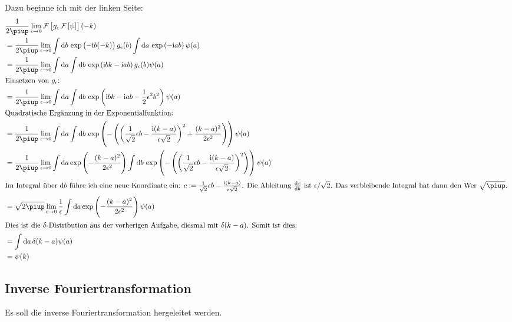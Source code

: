 Dazu beginne ich mit der linken Seite:
\begin{align*}
	& \frac1{2\piup} \lim_{\epsilon\to0} \fourier\sbr{g_\epsilon \fourier\sbr\psi}(-k) \\
	&= \frac1{2\piup} \lim_{\epsilon\to0} \int \dif b \, \exp\del{-\ii b (-k)} g_\epsilon(b) \int \dif a \, \exp\del{-\ii a b} \psi(a) \\
	&= \frac1{2\piup} \lim_{\epsilon\to0} \int \dif a \int \dif b \, \exp\del{\ii bk-\ii ab} g_\epsilon(b) \psi(a) \\
	\intertext{%
		Einsetzen von $g_\epsilon$:
	}
	&= \frac1{2\piup} \lim_{\epsilon\to0} \int \dif a \int \dif b \, \exp\del{\ii bk-\ii ab -\half \epsilon^2 b^2}  \psi(a) \\
	\intertext{%
		Quadratische Ergänzung in der Exponentialfunktion:
	}
	&= \frac1{2\piup} \lim_{\epsilon\to0} \int \dif a \int \dif b \, \exp\del{-\del{\del{\frac{1}{\sqrt{2}} \epsilon b - \frac{\ii(k-a)}{\epsilon \sqrt{2}}}^2 + \frac{(k-a)^2}{2\epsilon^2}}}  \psi(a) \\
	&= \frac1{2\piup} \lim_{\epsilon\to0} \int \dif a \exp\del{-\frac{(k-a)^2}{2\epsilon^2}} \int \dif b \, \exp\del{-\del{\del{\frac{1}{\sqrt{2}} \epsilon b - \frac{\ii(k-a)}{\epsilon \sqrt{2}}}^2}} \psi(a) \\
	\intertext{%
		Im Integral über $\dif b$ führe ich eine neue Koordinate ein: $c :=
		\frac{1}{\sqrt{2}} \epsilon b - \frac{\ii(k-a)}{\epsilon \sqrt{2}}$.
		Die Ableitung $\od cb$ ist $\epsilon/\sqrt 2$. Das verbleibende
		Integral hat dann den Wer $\sqrt \piup$.
	}
	&= \sqrt{2\piup} \lim_{\epsilon\to0} \frac{1}{\epsilon} \int \dif a \exp\del{-\frac{(k-a)^2}{2\epsilon^2}} \psi(a) \\
	\intertext{%
		Dies ist die $\delta$-Distribution aus der vorherigen Aufgabe, diesmal mit $\delta(k-a)$. Somit ist dies:
	}
	&= \int \dif a \, \delta(k-a) \psi(a) \\
	&= \psi(k)
\end{align*}

\subsection{Inverse Fouriertransformation}

Es soll die inverse Fouriertransformation hergeleitet werden.

